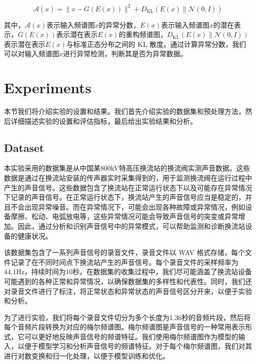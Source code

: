 \documentclass{article}
\begin{document}
\begin{equation}
\mathcal{A}(x)=\|x-G(E(x))\|^2+D_{\mathrm{KL}}(E(x) \| \mathcal{N}(0, I))
\end{equation}

其中，$\mathcal{A}(x)$表示输入频谱图$x$的异常分数，$E(x)$表示输入频谱图$x$的潜在表示，$G(E(x))$表示潜在表示$E(x)$的重构频谱图，$D_{\mathrm{KL}}(E(x) \| \mathcal{N}(0, I))$表示潜在表示$E(x)$与标准正态分布之间的 KL 散度。通过计算异常分数，我们可以对输入频谱图$x$进行异常检测，判断其是否为异常数据。

\section{Experiments}
本节我们将介绍实验的设置和结果。我们首先介绍实验的数据集和预处理方法，然后详细描述实验的设置和评估指标，最后给出实验结果和分析。

\subsection{Dataset}
本实验采用的数据集是从中国某800kV特高压换流站的换流阀实测声音数据。这些数据是通过在换流站安装的传声器实时采集得到的，用于监测换流阀在运行过程中产生的声音信号。这些数据包含了换流站在正常运行状态下以及可能存在异常情况下记录的声音信号。在正常运行状态下，换流站产生的声音信号应当是稳定的，并且不会出现异常噪音。而在异常情况下，可能会出现各种故障或异常情况，例如设备摩擦、松动、电弧放电等，这些异常情况可能会导致声音信号的突变或异常增加。因此，通过分析和识别声音信号中的异常模式，可以帮助监测和诊断换流站设备的健康状况。

该数据集包含了一系列声音信号的录音文件，录音文件以 WAV 格式存储，每个文件记录了在不同时间点下换流站产生的声音信号。每个录音文件的采样频率为44.1Hz，持续时间为10秒。在数据集的收集过程中，我们尽可能涵盖了换流站设备可能遇到的各种正常和异常情况，以确保数据集的多样性和代表性。同时，我们还对录音文件进行了标注，将正常状态和异常状态的声音信号区分开来，以便于实验和分析。



为了进行实验，我们将每个录音文件切分为多个长度为1.36秒的音频片段，然后将每个音频片段转换为对应的梅尔频谱图。梅尔频谱图是声音信号的一种常用表示形式，它可以更好地反映声音信号的频谱特征。我们使用梅尔频谱图作为模型的输入，以便于模型学习和分析声音信号的频谱特征。对于每个梅尔频谱图，我们对其进行对数变换和归一化处理，以便于模型训练和优化。
\end{document}
